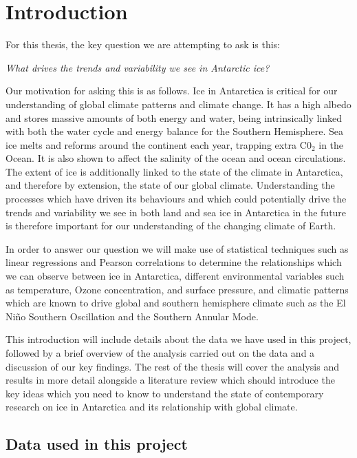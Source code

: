 \documentclass[../main.tex]{subfiles}
\begin{document}
\chapter{Introduction}
For this thesis, the key question we are attempting to ask is this:
\medskip 

\begin{tcolorbox}[colback=white!98!black,colframe=gray!60!blue]
\centering
	\textit{What drives the trends and variability we see in Antarctic ice?}
\end{tcolorbox}

Our motivation for asking this is as follows. Ice in Antarctica is critical for our understanding of global climate patterns and climate change. It has a high albedo and stores massive amounts of both energy and water, being intrinsically linked with both the water cycle and energy balance for the Southern Hemisphere. Sea ice melts and reforms around the continent each year, trapping extra C0$_2$ in the Ocean. It is also shown to affect the salinity of the ocean and ocean circulations. 
The extent of ice is additionally linked to the state of the climate in Antarctica, and therefore by extension, the state of our global climate. Understanding the processes which have driven its behaviours and which could potentially drive the trends and variability we see in both land and sea ice in Antarctica in the future is therefore important for our understanding of the changing climate of Earth.

In order to answer our question we will make use of statistical techniques such as linear regressions and Pearson correlations to determine the relationships which we can observe between ice in Antarctica, different environmental variables such as temperature, Ozone concentration, and surface pressure, and climatic patterns which are known to drive global and southern hemisphere climate such as the El Ni\~no Southern Oscillation and the Southern Annular Mode.

This introduction will include details about the data we have used in this project, followed by a brief overview of the analysis carried out on the data and a discussion of our key findings. The rest of the thesis will cover the analysis and results in more detail alongside a literature review which should introduce the key ideas which you need to know to understand the state of contemporary research on ice in Antarctica and its relationship with global climate.


\section{Data used in this project}
\end{document}
